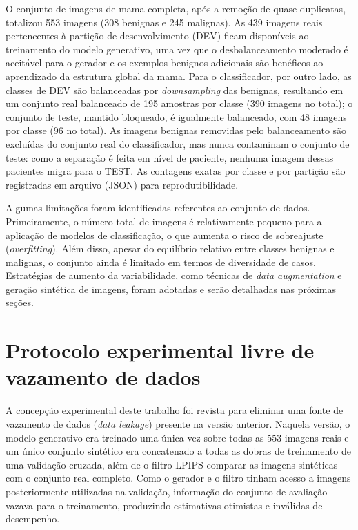 \documentclass[
	12pt,				%
	openright,			%
	oneside,			%
	a4paper,			%
	tcc,			%
	]{ABNT-DC-UEL}
\begin{document}
O conjunto de imagens de mama completa, após a remoção de quase-duplicatas, totalizou 553 imagens (308 benignas e 245 malignas). As 439 imagens reais pertencentes à partição de desenvolvimento (DEV) ficam disponíveis ao treinamento do modelo generativo, uma vez que o desbalanceamento moderado é aceitável para o gerador e os exemplos benignos adicionais são benéficos ao aprendizado da estrutura global da mama. Para o classificador, por outro lado, as classes de DEV são balanceadas por \textit{downsampling} das benignas, resultando em um conjunto real balanceado de 195 amostras por classe (390 imagens no total); o conjunto de teste, mantido bloqueado, é igualmente balanceado, com 48 imagens por classe (96 no total). As imagens benignas removidas pelo balanceamento são excluídas do conjunto real do classificador, mas nunca contaminam o conjunto de teste: como a separação é feita em nível de paciente, nenhuma imagem dessas pacientes migra para o TEST. As contagens exatas por classe e por partição são registradas em arquivo (JSON) para reprodutibilidade.

Algumas limitações foram identificadas referentes ao conjunto de dados. Primeiramente, o número total de imagens é relativamente pequeno para a aplicação de modelos de classificação, o que aumenta o risco de sobreajuste (\textit{overfitting}). Além disso, apesar do equilíbrio relativo entre classes benignas e malignas, o conjunto ainda é limitado em termos de diversidade de casos. Estratégias de aumento da variabilidade, como técnicas de \textit{data augmentation} e geração sintética de imagens, foram adotadas e serão detalhadas nas próximas seções.

\section{Protocolo experimental livre de vazamento de dados}
\label{sec:protocolo}

A concepção experimental deste trabalho foi revista para eliminar uma fonte de vazamento de dados (\textit{data leakage}) presente na versão anterior. Naquela versão, o modelo generativo era treinado uma única vez sobre todas as 553 imagens reais e um único conjunto sintético era concatenado a todas as dobras de treinamento de uma validação cruzada, além de o filtro LPIPS comparar as imagens sintéticas com o conjunto real completo. Como o gerador e o filtro tinham acesso a imagens posteriormente utilizadas na validação, informação do conjunto de avaliação vazava para o treinamento, produzindo estimativas otimistas e inválidas de desempenho.
\end{document}
